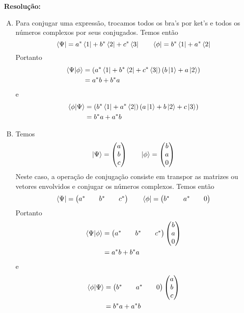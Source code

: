 \documentclass[a4paper, 12pt, notitlepage]{article}
\begin{document}
\begin{enumerate}
\textbf{Resolução: }

\begin{enumerate}[(A)]
  \item Para conjugar uma expressão, trocamos todos os bra's por ket's e todos os números complexos por seus conjugados. Temos então
  \[
  \bra{\Psi} = a^\ast \bra{1} + b^\ast \bra{2} + c^\ast \bra{3} \qquad \bra{\phi} = b^\ast \bra{1} + a^\ast \bra{2}
  \]
  Portanto
  \begin{align*}
    \bra{\Psi}\ket{\phi} &= \left(a^\ast \bra{1} + b^\ast \bra{2} + c^\ast \bra{3}\right)\left(b\ket{1} + a\ket{2}\right) \\
    &= a^\ast b + b^\ast a
  \end{align*}
  e
  \begin{align*}
    \bra{\phi}\ket{\Psi} &= \left(b^\ast \bra{1} + a^\ast \bra{2}\right)\left(a\ket{1} + b\ket{2} + c\ket{3}\right) \\
    &= b^\ast a + a^\ast b
  \end{align*}
  \item Temos
  \[
    \ket{\Psi} = \begin{pmatrix} a \\ b \\ c \end{pmatrix} \qquad \ket{\phi} = \begin{pmatrix} b \\ a \\ 0 \end{pmatrix}
  \]
  Neste caso, a operação de conjugação consiste em transpor as matrizes ou vetores envolvidos e conjugar os números complexos. Temos então
  \[
    \bra{\Psi} = \begin{pmatrix} a^\ast && b^\ast && c^\ast \end{pmatrix} \qquad \bra{\phi} = \begin{pmatrix} b^\ast && a^\ast && 0 \end{pmatrix}
  \]
  Portanto
  \begin{align*}
    \bra{\Psi}\ket{\phi} &= \begin{pmatrix} a^\ast && b^\ast && c^\ast\end{pmatrix} \begin{pmatrix} b \\ a \\ 0 \end{pmatrix} \\
    &= a^\ast b + b^\ast a
  \end{align*}
  e
  \begin{align*}
    \bra{\phi}\ket{\Psi} &= \begin{pmatrix} b^\ast && a^\ast && 0 \end{pmatrix} \begin{pmatrix} a \\ b \\ c \end{pmatrix} \\
    &= b^\ast a + a^\ast b
  \end{align*}
  

\end{enumerate}
\end{enumerate}
\end{document}
